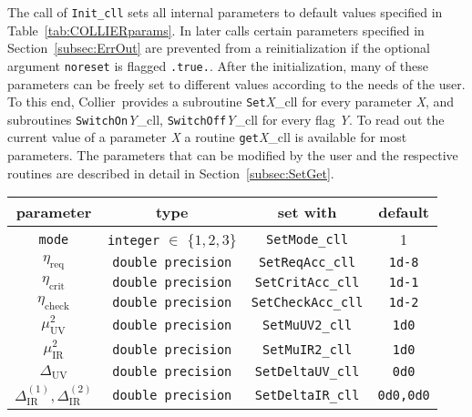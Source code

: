 \documentclass[preprint,sort&compress,12pt]{elsarticle}
\def\arraystretch{1.2}
\def\refta#1{\mbox{Table~\ref{#1}}}
\def\refse#1{\mbox{Section~\ref{#1}}}
\newcommand{\UV}{{\mathrm{UV}}}
\newcommand{\IR}{{\mathrm{IR}}}
\newcommand{\collier}{{\sc Collier}}
\begin{document}
The call of {\tt Init\_cll} sets all internal parameters to default values specified in 
\refta{tab:COLLIERparams}. In later calls certain parameters specified in \refse{subsec:ErrOut} are prevented from a reinitialization
if the optional argument {\tt noreset} is flagged {\tt .true.}. After the initialization, many of these parameters can be 
freely set to different values according to the needs of the user. To
this end, \collier\ provides a subroutine {\tt Set}{\it X}{\_cll} for
every parameter {\it X}, and subroutines {\tt SwitchOn}{\it Y}{\_cll},
{\tt SwitchOff}{\it Y}{\_cll} for every flag {\it Y}. To read out the
current value of a parameter {\it X} a routine {\tt get}{\it X}{\_cll}
is available for most parameters. 
The parameters that can be modified by the user and the
respective routines are described in detail in \refse{subsec:SetGet}.
\begin{table}
\begin{center}
\renewcommand{\arraystretch}{1.2}
\renewcommand{\tabcolsep}{.2em}
    \begin{tabular}{c|c|c|c}
parameter  & type   & set with %
           & default  \\
\hline \hline
{\tt mode} & {\tt integer} $\in$ $\{1,2,3\}$ & {\tt SetMode\_cll} %
           & 1 \\
\hline
$\eta_\textrm{req}$ & {\tt double precision} & {\tt SetReqAcc\_cll} %
           & {\tt 1d-8} \\
\hline
$\eta_\textrm{crit}$ & {\tt double precision} & {\tt SetCritAcc\_cll} %
           & {\tt 1d-1} \\
\hline
$\eta_\textrm{check}$ & {\tt double precision} & {\tt SetCheckAcc\_cll} %
           & {\tt 1d-2} \\
\hline
$\mu_\UV^2$ & {\tt double precision} & {\tt SetMuUV2\_cll} %
            & {\tt 1d0} \\
\hline
$\mu_\IR^2$ & {\tt double precision} & {\tt SetMuIR2\_cll} %
            & {\tt 1d0} \\
\hline
$\Delta_\UV$ & {\tt double precision} & {\tt SetDeltaUV\_cll} %
            & {\tt 0d0} \\
\hline
$\Delta_\IR^{(1)},\Delta_\IR^{(2)}$ & {\tt double precision} & {\tt SetDeltaIR\_cll} %
            & {\tt 0d0,0d0} \\

\end{tabular}
\end{center}
\end{table}
\end{document}
